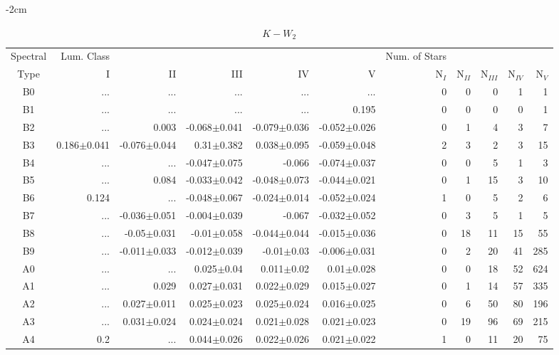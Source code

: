 \begin{table}[t]
\tiny
\centering
\caption{$K-W_{2}$}
\begin{center}
    \addtolength{\leftskip} {-2cm}
    \addtolength{\rightskip}{-2cm}
    \begin{tabular}{c|rrrrr|rrrrr}
    \toprule
    Spectral & Lum. Class & & & & & Num. of Stars & & & &  \\
    Type & I & II & III &  IV & V & N$_{I}$ & N$_{II}$ & N$_{III}$ & N$_{IV}$ & N$_{V}$ \\ \midrule
 
B0	&	 ...	&	 ...	&	 ...	&	 ...	&	 ...	&	0	&	0	&	0	&	1	&	1	\\
B1	&	 ...	&	 ...	&	 ...	&	 ...	&	0.195	&	0	&	0	&	0	&	0	&	1	\\
B2	&	 ...	&	0.003	&	-0.068$\pm$0.041	&	-0.079$\pm$0.036	&	-0.052$\pm$0.026	&	0	&	1	&	4	&	3	&	7	\\
B3	&	0.186$\pm$0.041	&	-0.076$\pm$0.044	&	0.31$\pm$0.382	&	0.038$\pm$0.095	&	-0.059$\pm$0.048	&	2	&	3	&	2	&	3	&	15	\\
B4	&	 ...	&	 ...	&	-0.047$\pm$0.075	&	-0.066	&	-0.074$\pm$0.037	&	0	&	0	&	5	&	1	&	3	\\
B5	&	 ...	&	0.084	&	-0.033$\pm$0.042	&	-0.048$\pm$0.073	&	-0.044$\pm$0.021	&	0	&	1	&	15	&	3	&	10	\\
B6	&	0.124	&	 ...	&	-0.048$\pm$0.067	&	-0.024$\pm$0.014	&	-0.052$\pm$0.024	&	1	&	0	&	5	&	2	&	6	\\
B7	&	 ...	&	-0.036$\pm$0.051	&	-0.004$\pm$0.039	&	-0.067	&	-0.032$\pm$0.052	&	0	&	3	&	5	&	1	&	5	\\
B8	&	 ...	&	-0.05$\pm$0.031	&	-0.01$\pm$0.058	&	-0.044$\pm$0.044	&	-0.015$\pm$0.036	&	0	&	18	&	11	&	15	&	55	\\
B9	&	 ...	&	-0.011$\pm$0.033	&	-0.012$\pm$0.039	&	-0.01$\pm$0.03	&	-0.006$\pm$0.031	&	0	&	2	&	20	&	41	&	285	\\
A0	&	 ...	&	 ...	&	0.025$\pm$0.04	&	0.011$\pm$0.02	&	0.01$\pm$0.028	&	0	&	0	&	18	&	52	&	624	\\
A1	&	 ...	&	0.029	&	0.027$\pm$0.031	&	0.022$\pm$0.029	&	0.015$\pm$0.027	&	0	&	1	&	14	&	57	&	335	\\
A2	&	 ...	&	0.027$\pm$0.011	&	0.025$\pm$0.023	&	0.025$\pm$0.024	&	0.016$\pm$0.025	&	0	&	6	&	50	&	80	&	196	\\
A3	&	 ...	&	0.031$\pm$0.024	&	0.024$\pm$0.024	&	0.021$\pm$0.028	&	0.021$\pm$0.023	&	0	&	19	&	96	&	69	&	215	\\
A4	&	0.2	&	 ...	&	0.044$\pm$0.026	&	0.022$\pm$0.026	&	0.021$\pm$0.022	&	1	&	0	&	11	&	20	&	75	\\

\end{tabular}
\end{center}
\end{table}

